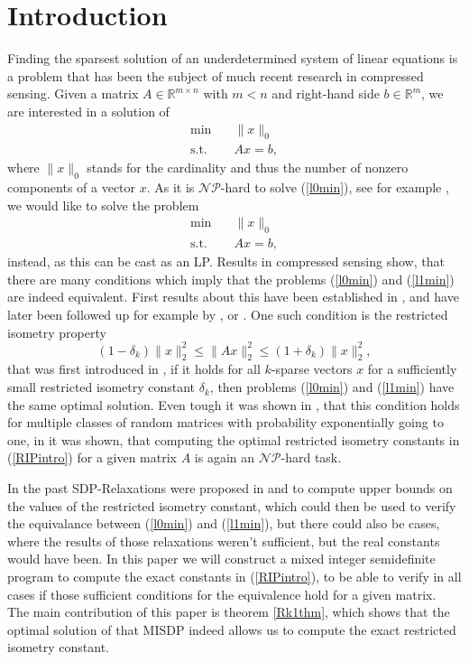 \documentclass{elsarticle}
\newcommand{\R}{\mathds{R}}
\begin{document}
\section{Introduction}
Finding the sparsest solution of an underdetermined system of linear equations is a problem that has been the subject of much recent research in compressed sensing. Given a matrix $A \in \R^{m \times n}$ with $m < n$ and 
right-hand side $b \in \R^m$, we are interested in a solution of 
\begin{align}\label{l0min}
 \text{min} \quad & \|x\|_0 \\
 \text{s.t.} \quad & Ax = b, \nonumber
\end{align}
where $\|x\|_0$ stands for the cardinality and thus the number of nonzero components of a vector $x$. As it is $\mathcal{NP}$-hard to solve (\ref{l0min}), see for example \cite{GareyJohnson}, we would like to solve the problem
\begin{align}\label{l1min}
 \text{min} \quad & \|x\|_0 \\
 \text{s.t.} \quad & Ax = b, \nonumber
\end{align}
instead, as this can be cast as an LP. Results in compressed sensing show, that there are many conditions which imply that the problems (\ref{l0min}) and (\ref{l1min}) are indeed equivalent. First results about this have been 
established in \cite{DH01}, and have later been followed up for example by \cite{CRT05}, \cite{Zha08} or \cite{BCT11}. One such condition is the restricted isometry property
\begin{equation}\label{RIPintro}
 (1-\delta_k)\|x\|_2^2 \leq \|Ax\|_2^2 \leq (1+\delta_k)\|x\|_2^2,
\end{equation}
that was first introduced in \cite{CT05}, if it holds for all $k$-sparse vectors $x$ for a sufficiently small restricted isometry constant $\delta_k$, then problems (\ref{l0min}) and (\ref{l1min}) have the same optimal solution. 
Even tough it was shown in \cite{BDDW08}, that this condition holds for multiple classes of random matrices with probability exponentially going to one, in \cite{PT14} it was shown, that computing the optimal restricted isometry 
constants in (\ref{RIPintro}) for a given matrix $A$ is again an
$\mathcal{NP}$-hard task.

In the past SDP-Relaxations were proposed in \cite{Asp07} and \cite{Asp08} to compute upper bounds on the values of the restricted isometry 
constant, which could then be used to verify the equivalance between (\ref{l0min}) and (\ref{l1min}), but there could also be cases, where the results of those relaxations weren't sufficient, but the real constants would have been. 
In this paper we will construct a mixed integer semidefinite program to compute the exact constants in (\ref{RIPintro}), to be able to verify in all cases if those sufficient conditions for the equivalence hold for a given matrix. 
The main contribution of this paper is theorem \ref{Rk1thm}, which shows
that the optimal solution of that MISDP indeed allows us to compute the
exact restricted isometry constant.
\end{document}
